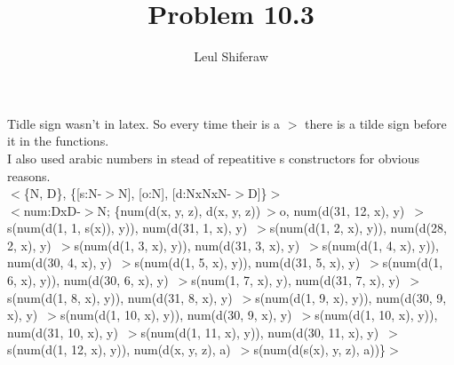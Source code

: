 \documentclass[a4paper]{article}
\title{Problem 10.3}
\author{Leul Shiferaw}
\begin{document}
\maketitle
\newpage
{}

Tidle sign wasn't in latex. So every time their is a $>$ there is a tilde sign before it in the functions.
\\I also used arabic numbers in stead of repeatitive s constructors for obvious reasons.\\
$<$\{N, D\}, \{[s:N-$>$N], [o:N], [d:NxNxN-$>$D]\}$>$\\
$<$num:DxD-$>$N; \{num(d(x, y, z), d(x, y, z))$~>$o, num(d(31, 12, x), y)~$>$s(num(d(1, 1, s(x)), y)), num(d(31, 1, x), y)~$>$s(num(d(1, 2, x), y)), num(d(28, 2, x), y)~$>$s(num(d(1, 3, x), y)), num(d(31, 3, x), y)~$>$s(num(d(1, 4, x), y)), num(d(30, 4, x), y)~$>$s(num(d(1, 5, x),  y)), num(d(31, 5, x), y)~$>$s(num(d(1, 6, x), y)), num(d(30, 6, x), y)~$>$s(num(1, 7, x), y), num(d(31, 7, x), y)~$>$s(num(d(1, 8, x), y)), num(d(31, 8, x), y)~$>$s(num(d(1, 9, x), y)), num(d(30, 9, x), y)~$>$s(num(d(1, 10, x), y)), num(d(30, 9, x), y)~$>$s(num(d(1, 10, x), y)), num(d(31, 10, x), y)~$>$s(num(d(1, 11, x), y)), num(d(30, 11, x), y)~$>$s(num(d(1, 12, x), y)), num(d(x, y, z), a)~$>$s(num(d(s(x), y, z), a))\}$>$\\
\end{document}
